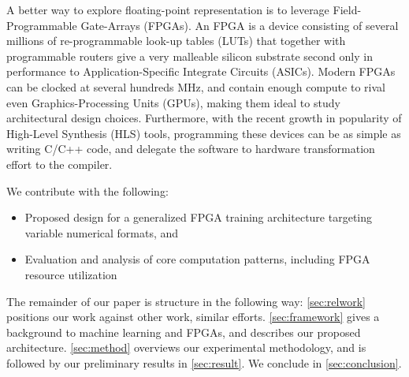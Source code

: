 \documentclass[techrep,english]{ipsj} %
\begin{document}
A better way to explore floating-point representation is to leverage Field-Programmable Gate-Arrays (FPGAs).
An FPGA is a device consisting of several millions of re-programmable look-up tables (LUTs) that together with programmable routers give a very malleable silicon substrate second only in performance to Application-Specific Integrate Circuits (ASICs).
Modern FPGAs can be clocked at several hundreds MHz, and contain enough compute to rival even Graphics-Processing Units (GPUs), making them ideal to study architectural design choices.
Furthermore, with the recent growth in popularity of High-Level Synthesis (HLS) tools, programming these devices can be as simple as writing C/C++ code, and delegate the software to hardware transformation effort to the compiler.

We contribute with the following:
\begin{itemize}
\item Proposed design for a generalized FPGA training architecture targeting variable numerical formats, and
\item Evaluation and analysis of core computation patterns, including FPGA resource utilization
\end{itemize}

The remainder of our paper is structure in the following way: \cref{sec:relwork} positions our work against other work, similar efforts.
\cref{sec:framework} gives a background to machine learning and FPGAs, and describes our proposed architecture.
\cref{sec:method} overviews our experimental methodology, and is followed by our preliminary results in \cref{sec:result}.
We conclude in \cref{sec:conclusion}.
\end{document}
